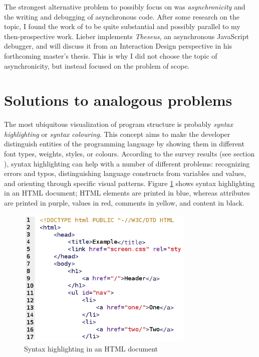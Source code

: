 The strongest alternative problem to possibly focus on was
\emph{asynchronicity} and the writing and debugging of asynchronous
code. After some research on the topic, I found the work of
 to be quite substantial and possibly parallel to my
then-prospective work. Lieber implements \emph{Theseus}, an asynchronous
JavaScript debugger, and will discuss it from an Interaction Design
perspective in his forthcoming master’s thesis. This is why I did not
choose the topic of asynchronicity, but instead focused on the problem
of scope.

\section{Solutions to analogous problems}\label{similar}

The most ubiquitous visualization of program structure is probably
\emph{syntax highlighting} or \emph{syntax colouring}. This concept aims
to make the developer distinguish entities of the programming language
by showing them in different font types, weights, styles, or colours.
According to the survey results (see section
), syntax highlighting can help with a number
of different problems: recognizing errors and typos, distinguishing
language constructs from variables and values, and orienting through
specific visual patterns. Figure \ref{fig:syntaxhighlighting} shows
syntax highlighting in an HTML document; HTML elements are printed in
blue, whereas attributes are printed in purple, values in red, comments
in yellow, and content in black.

\begin{figure}[htbp]
\centering
\includegraphics[keepaspectratio,width=0.75\textwidth]{img/syntax_highlighting.png}
\caption{Syntax highlighting in an HTML document}
\label{fig:syntaxhighlighting}
\end{figure}

